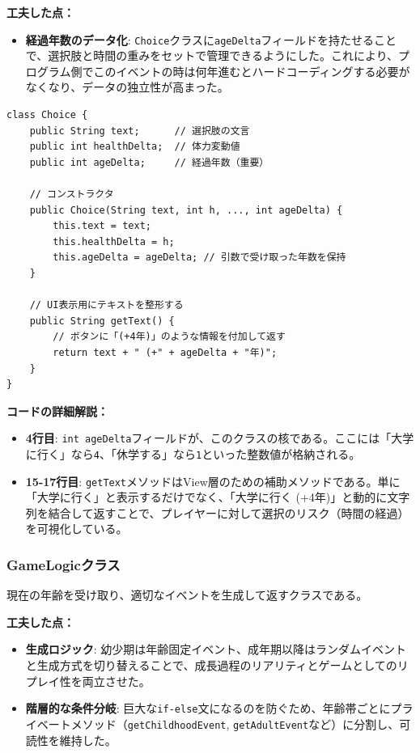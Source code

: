 \documentclass[a4paper,11pt]{jsarticle}
\begin{document}
\textbf{工夫した点：}
\begin{itemize}
    \item \textbf{経過年数のデータ化}: \texttt{Choice}クラスに\texttt{ageDelta}フィールドを持たせることで、選択肢と時間の重みをセットで管理できるようにした。これにより、プログラム側でこのイベントの時は何年進むとハードコーディングする必要がなくなり、データの独立性が高まった。
\end{itemize}

\begin{lstlisting}[caption=Choice.java, label=code:choice_detail]
class Choice {
    public String text;      // 選択肢の文言
    public int healthDelta;  // 体力変動値
    public int ageDelta;     // 経過年数（重要）

    // コンストラクタ
    public Choice(String text, int h, ..., int ageDelta) {
        this.text = text;
        this.healthDelta = h;
        this.ageDelta = ageDelta; // 引数で受け取った年数を保持
    }
    
    // UI表示用にテキストを整形する
    public String getText() {
        // ボタンに「(+4年)」のような情報を付加して返す
        return text + " (+" + ageDelta + "年)";
    }
}
\end{lstlisting}

\textbf{コードの詳細解説：}
\begin{itemize}
    \item \textbf{4行目}: \texttt{int ageDelta}フィールドが、このクラスの核である。ここには「大学に行く」なら\texttt{4}、「休学する」なら\texttt{1}といった整数値が格納される。
    \item \textbf{15-17行目}: \texttt{getText}メソッドはView層のための補助メソッドである。単に「大学に行く」と表示するだけでなく、「大学に行く (+4年)」と動的に文字列を結合して返すことで、プレイヤーに対して選択のリスク（時間の経過）を可視化している。
\end{itemize}

\subsubsection{GameLogicクラス}
現在の年齢を受け取り、適切なイベントを生成して返すクラスである。

\textbf{工夫した点：}
\begin{itemize}
    \item \textbf{生成ロジック}: 幼少期は年齢固定イベント、成年期以降はランダムイベントと生成方式を切り替えることで、成長過程のリアリティとゲームとしてのリプレイ性を両立させた。
    \item \textbf{階層的な条件分岐}: 巨大な\texttt{if-else}文になるのを防ぐため、年齢帯ごとにプライベートメソッド（\texttt{getChildhoodEvent}, \texttt{getAdultEvent}など）に分割し、可読性を維持した。
\end{itemize}
\end{document}
